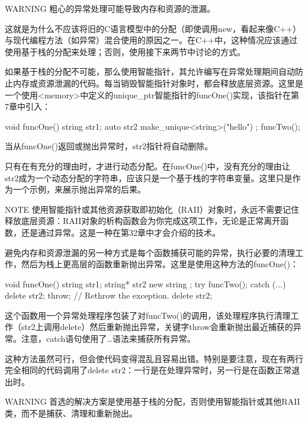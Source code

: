 \begin{myWarning}{WARNING}
粗心的异常处理可能导致内存和资源的泄漏。
\end{myWarning}

这就是为什么不应该将旧的C语言模型中的分配（即使调用new，看起来像C++）与现代编程方法（如异常）混合使用的原因之一。在C++中，这种情况应该通过使用基于栈的分配来处理；否则，使用接下来两节中讨论的方式。


如果基于栈的分配不可能，那么使用智能指针，其允许编写在异常处理期间自动防止内存或资源泄漏的代码。每当销毁智能指针对象时，都会释放底层资源。这里是一个使用<memory>中定义的unique\_ptr智能指针的funcOne()实现，该指针在第7章中引入：

\begin{cpp}
void funcOne()
{
    string str1;
    auto str2 { make_unique<string>("hello") };
    funcTwo();
}
\end{cpp}

当从funcOne()返回或抛出异常时，str2指针将自动删除。

只有在有充分的理由时，才进行动态分配。在funcOne()中，没有充分的理由让str2成为一个动态分配的字符串，应该只是一个基于栈的字符串变量。这里只是作为一个示例，来展示抛出异常的后果。

\begin{myNotic}{NOTE}
使用智能指针或其他资源获取即初始化（RAII）对象时，永远不需要记住释放底层资源：RAII对象的析构函数会为你完成这项工作，无论是正常离开函数，还是通过异常。这是一种在第32章中才会介绍的技术。
\end{myNotic}


避免内存和资源泄漏的另一种方式是每个函数捕获可能的异常，执行必要的清理工作，然后为栈上更高层的函数重新抛出异常。这里是使用这种方法的funcOne()：

\begin{cpp}
void funcOne()
{
    string str1;
    string* str2 { new string {} };
    try {
        funcTwo();
    } catch (...) {
        delete str2;
        throw; // Rethrow the exception.
    }
    delete str2;
}
\end{cpp}

这个函数用一个异常处理程序包装了对funcTwo()的调用，该处理程序执行清理工作（str2上调用delete）然后重新抛出异常，关键字throw会重新抛出最近捕获的异常。注意，catch语句使用了…语法来捕获所有异常。

这种方法虽然可行，但会使代码变得混乱且容易出错。特别是要注意，现在有两行完全相同的代码调用了delete str2：一行是在处理异常时，另一行是在函数正常退出时。

\begin{myWarning}{WARNING}
首选的解决方案是使用基于栈的分配，否则使用智能指针或其他RAII类，而不是捕获、清理和重新抛出。
\end{myWarning}















